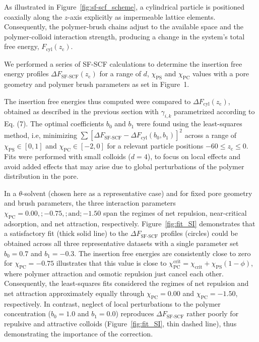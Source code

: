 \documentclass[10pt, a4paper, twocolumn]{article}
\begin{document}
As illustrated in Figure~\ref{fig:sf-scf_scheme}, a cylindrical particle is positioned coaxially along the $z$-axis explicitly as impermeable lattice elements.
Consequently, the polymer-brush chains adjust to the available space and the polymer-colloid interaction strength, producing a change in the system's total free energy, $F_{\text{cyl}}(z_{\text{c}})$.

We performed a series of SF-SCF calculations to determine the insertion free energy profiles $\Delta F_{\text{SF-SCF}}(z_{\text{c}})$ for a range of $d$, $\chi_{\text{PS}}$ and $\chi_{\text{PC}}$ values with a pore geometry and polymer brush parameters as set in Figure~1.

The insertion free energies thus computed were compared to $\Delta F_{\text{cyl}}(z_{\text{c}})$, obtained as described in the previous section with $\gamma_{i,k}$ parametrized according to Eq. (7).
The optimal coefficients $b_0$ and $b_1$ were found using the least-squares method, i.e, minimizing $\sum [\Delta F_{\text{SF-SCF}} - \Delta F_{\text{cyl}}(b_0,b_1)]^2$ across a range of $\chi_{\text{PS}} \in [0,1]$  and $\chi_{\text{PC}} \in [-2,0]$ for a relevant particle positions $-60 \leq z_{\text{c}} \leq 0$.
Fits were performed with small colloids ($d=4$), to focus on local effects and avoid added effects that may arise due to global perturbations of the polymer distribution in the pore.

In a $\theta$-solvent (chosen here as a representative case) and for fixed pore geometry and brush parameters, the three interaction parameters
$\chi_{\text{PC}} = 0.00,; -0.75,; \text{and}; -1.50$ span the regimes of net repulsion, near-critical adsorption, and net attraction, respectively.
Figure~\ref{fig:fit_SI} demonstrates that a satisfactory fit (thick solid line) to the $\Delta F_{\text{SF-SCF}}$ profiles (circles) could be obtained across all three representative datasets with a single parameter set $b_0 = 0.7$ and $b_1 = -0.3$.
The insertion free energies are consistently close to zero for $\chi_{\text{PC}} = -0.75$ illustrates that this value is close to $\chi_{\text{PC}}^{\text{crit}} = \chi_{\text{crit}} + \chi_{\text{PS}} (1 - \phi)$, where polymer attraction and osmotic repulsion just cancel each other.
Consequently, the least-squares fits considered the regimes of net repulsion and net attraction approximately equally through $\chi_{\text{PC}} = 0.00$ and $\chi_{\text{PC}} = -1.50$, respectively.
In contrast, neglect of local perturbations to the polymer concentration ($b_0 = 1.0$ and $b_1 = 0.0$) reproduces $\Delta F_{\text{SF-SCF}}$ rather poorly for repulsive and attractive colloids (Figure~\ref{fig:fit_SI}, thin dashed line), thus demonstrating the importance of the correction.
\end{document}
